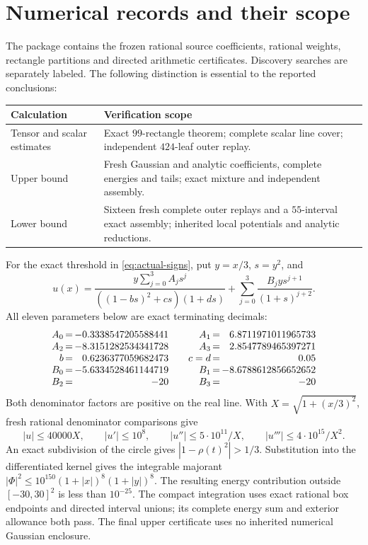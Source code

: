 \documentclass[11pt]{article}
\begin{document}
\section{Numerical records and their scope}\label{app:records}
The package contains the frozen rational source coefficients, rational weights, rectangle partitions and directed arithmetic certificates. Discovery searches are separately labeled. The following distinction is essential to the reported conclusions:
\begin{center}\small
\begin{tabular}{p{}p{}}
\hline
Calculation & Verification scope\\\hline
Tensor and scalar estimates & Exact $99$-rectangle theorem; complete scalar line cover; independent $424$-leaf outer replay.\\
Upper bound & Fresh Gaussian and analytic coefficients, complete energies and tails; exact mixture and independent assembly.\\
Lower bound & Sixteen fresh complete outer replays and a $55$-interval exact assembly; inherited local potentials and analytic reductions.\\\hline
\end{tabular}
\end{center}

For the exact threshold in \eqref{eq:actual-signs}, put $y=x/3$, $s=y^2$, and
\begin{equation}\label{eq:threshold}
 u(x)=\frac{y\sum_{j=0}^3A_js^j}{((1-bs)^2+cs)(1+ds)}
       +\sum_{j=0}^3\frac{B_jys^{j+1}}{(1+s)^{j+2}}.
\end{equation}
All eleven parameters below are exact terminating decimals:
\begin{equation*}
\begin{array}{r@{\,=\,}r@{\qquad}r@{\,=\,}r}
 A_0&-0.3338547205588441&A_1&6.8711971011965733\\
 A_2&-8.3151282534341728&A_3&2.8547789465397271\\
 b&0.6236377059682473&c=d&0.05\\
 B_0&-5.6334528461144719&B_1&-8.6788612856652652\\
 B_2&-20&B_3&-20
\end{array}
\end{equation*}
Both denominator factors are positive on the real line. With $X=\sqrt{1+(x/3)^2}$, fresh rational denominator comparisons give
\begin{equation*}
 |u|\le40000X,\qquad |u'|\le10^8,\qquad
 |u''|\le5\cdot10^{11}/X,\qquad
 |u'''|\le4\cdot10^{15}/X^2.
\end{equation*}
An exact subdivision of the circle gives $|1-\rho(t)^2|>1/3$. Substitution into the differentiated kernel gives the integrable majorant
$|\Phi|^2\le10^{150}(1+|x|)^8(1+|y|)^8$.
The resulting energy contribution outside $[-30,30]^2$ is less than $10^{-25}$. The compact integration uses exact rational box endpoints and directed interval unions; its complete energy sum and exterior allowance both pass. The final upper certificate uses no inherited numerical Gaussian enclosure.
\end{document}
